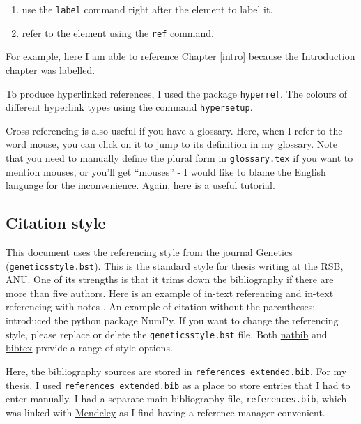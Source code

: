 \begin{enumerate}
    \item use the \texttt{label} command right after the element to label it.
    \item refer to the element using the \texttt{ref} command.
\end{enumerate}

For example, here I am able to reference Chapter \ref{intro} because the Introduction chapter was labelled. 

To produce hyperlinked references, I used the package \texttt{hyperref}. The colours of different hyperlink types using the command \texttt{hypersetup}.

Cross-referencing is also useful if you have a glossary. Here, when I refer to the word \gls{mouse}, you can click on it to jump to its definition in my glossary. Note that you need to manually define the plural form in \texttt{glossary.tex} if you want to mention \glspl{mouse}, or you'll get ``mouses'' - I would like to blame the English language for the inconvenience. Again, \href{https://www.overleaf.com/learn/latex/Glossaries}{here} is a useful tutorial.

\subsection{Citation style}

This document uses the referencing style from the journal Genetics (\texttt{geneticsstyle.bst}). This is the standard style for thesis writing at the RSB, ANU. One of its strengths is that it trims down the bibliography if there are more than five authors. Here is an example of in-text referencing \citep{harris2020array} and in-text referencing with notes \citep[Note: NumPy is cool;][]{harris2020array}. An example of citation without the parentheses: \citet{harris2020array} introduced the python package NumPy. If you want to change the referencing style, please replace or delete the \texttt{geneticsstyle.bst} file. Both \href{https://www.overleaf.com/learn/latex/Natbib_bibliography_styles}{natbib} and \href{https://www.overleaf.com/learn/latex/Bibtex_bibliography_styles}{bibtex} provide a range of style options.  

Here, the bibliography sources are stored in \texttt{references\_extended.bib}. For my thesis, I used \texttt{references\_extended.bib} as a place to store entries that I had to enter manually. I had a separate main bibliography file, \texttt{references.bib}, which was linked with \href{https://www.mendeley.com/?interaction_required=true}{Mendeley} as I find having a reference manager convenient.

